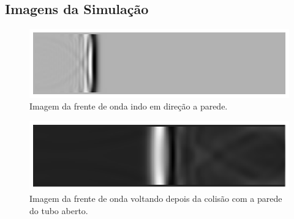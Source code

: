 \subsection{Imagens da Simulação}
\begin{figure}[h!]
    \centering
 	\hspace{-1.5cm}
    \includegraphics[width=1\textwidth]{code_matlab/code_refactored/closed-anechoic/normal.eps}
    \caption{Imagem da frente de onda indo em direção a parede.}
    \label{fig6}
\end{figure}
\begin{figure}[h!]
    \centering
 	\hspace{-1.5cm}
    \includegraphics[width=1\textwidth]{code_matlab/code_refactored/closed-opened/print_c_o.eps}
    \caption{Imagem da frente de onda voltando depois da colisão com a parede do tubo aberto.}
    \label{fig7}
\end{figure}

\newpage
